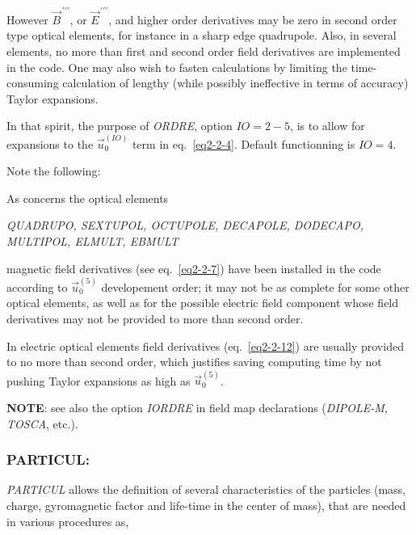 However  $ \vec  B^{\,\prime\prime\prime} $,  
or $ \vec  E^{\,\prime\prime\prime} $, and higher order derivatives  may be zero in second order type
optical elements, for instance in a sharp edge quadrupole. Also, in 
several elements, no more than  first and second order field 
derivatives  are implemented in the code.  One may also wish to fasten calculations by 
limiting the time-consuming calculation of lengthy (while possibly ineffective in terms 
of accuracy) Taylor expansions. 

\bigskip

\noindent In that spirit, the purpose of \textsl{ORDRE}, option $ IO=2-5$,  is to allow for 
expansions  to the  $ \vec  u^{(IO)}_0$ term  in eq.~\ref{eq2-2-4}. Default functionning 
is $IO=4$.

\bigskip

\noindent Note the following: 

As concerns the optical elements
\begin{center}
	\textsl{QUADRUPO, SEXTUPOL, OCTUPOLE, DECAPOLE, DODECAPO,
	MULTIPOL, ELMULT, EBMULT}
\end{center}
 magnetic field derivatives (see eq.~\ref{eq2-2-7}) have been installed in the code according 
to $ \vec  u^{(5)}_0$ developement order; it may not 
be as complete for some other optical elements, as well as for the 
 possible electric field  component whose field derivatives may not be provided 
 to more than second order. 

In electric optical elements field  derivatives (eq.~\ref{eq2-2-12}) are usually provided to no more than second 
order, which justifies saving computing time by not pushing Taylor expansions as high as  
$ \vec  u^{(5)}_0$. 


\bigskip

\noindent\textbf{NOTE}: see also the option \textsl{IORDRE} in field map
declarations (\textsl{DIPOLE-M, TOSCA}, etc.).  
 \newpage

\subsubsection*{PARTICUL: \PARTICULTitl}  \label{PARTICUL} 

\textsl{PARTICUL} allows the definition of several characteristics of the particles 
(mass, charge, gyromagnetic factor and life-time in the 
center of mass), that are needed in various  procedures as, 
\bigskip           

